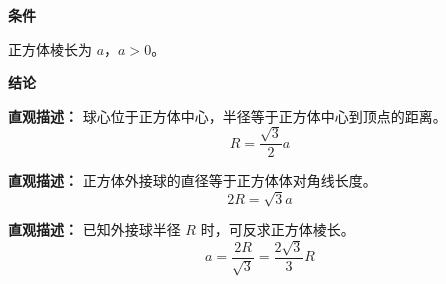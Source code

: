 \begin{statementbox}
	\textbf{\textcolor{CStatement}{条件}}

	\begin{description}[style=nextline, leftmargin=2.8em, labelsep=0.5em, itemsep=0.35em]
		\item[\textbf{\textcolor{CStatement}{条件1（正方体棱长）：}}]
		      正方体棱长为 $a$，$a>0$。
	\end{description}

	\textbf{\textcolor{CStatement}{结论}}

	\begin{description}[style=nextline, leftmargin=2.8em, labelsep=0.5em, itemsep=0.45em]
		\item[\textbf{\textcolor{CStatement}{结论一（外接球半径）：}}]
		      \textbf{\textcolor{CStatement}{直观描述：}} 球心位于正方体中心，半径等于正方体中心到顶点的距离。
		      \[
			      R=\frac{\sqrt{3}}{2}a
		      \]

		\item[\textbf{\textcolor{CStatement}{结论二（体对角线关系）：}}]
		      \textbf{\textcolor{CStatement}{直观描述：}} 正方体外接球的直径等于正方体体对角线长度。
		      \[
			      2R=\sqrt{3}a
		      \]

		\item[\textbf{\textcolor{CStatement}{常见变形（反求棱长）：}}]
		      \textbf{\textcolor{CStatement}{直观描述：}} 已知外接球半径 $R$ 时，可反求正方体棱长。
		      \[
			      a=\frac{2R}{\sqrt{3}}=\frac{2\sqrt{3}}{3}R
		      \]
	\end{description}
\end{statementbox}
